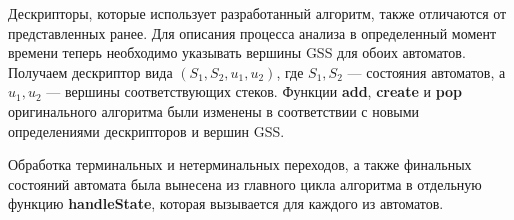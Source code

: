 Дескрипторы, которые использует разработанный алгоритм, также отличаются от представленных ранее. Для описания процесса анализа в определенный момент времени теперь необходимо указывать вершины GSS для обоих автоматов. Получаем дескриптор вида $(S_1, S_2, u_1, u_2)$, где $S_1, S_2$ --- состояния автоматов, а $u_1, u_2$ --- вершины соответствующих стеков. Функции \textbf{add}, \textbf{create} и \textbf{pop} оригинального алгоритма были изменены в соответствии с новыми определениями дескрипторов и вершин GSS.
%
%  

Обработка терминальных и нетерминальных переходов, а также финальных состояний автомата была вынесена из главного цикла алгоритма в отдельную функцию \textbf{handleState}, которая вызывается для каждого из автоматов.

